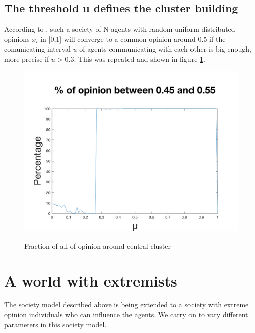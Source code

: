 \documentclass[11pt]{article}
\begin{document}
\subsection{The threshold u defines the cluster building}
According to \cite{Minor}, such a society of N agents with random uniform distributed opinions $x_i$ in [0,1] will converge to a common opinion around 0.5 if the comunicating interval $u$ of agents communicating with each other is big enough, more precise if $u>0.3$. This was repeated and shown in figure  \ref{fig:uwithoutextremists}.

\begin{figure}[!htb]
\center
\caption{Fraction of all of opinion around central cluster}
  \includegraphics[width=0.6\linewidth]{gen_plot_intervall_2017121418231461579e+01.png}
  \label{fig:uwithoutextremists}
\end{figure}

\section{A world with extremists}
The society model described above is being extended to a society with extreme opinion individuals who can influence the agents. We carry on to vary different parameters in this society model.
\end{document}
